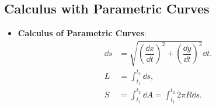 \subsection{Calculus with Parametric Curves} 
\begin{center}
\begin{tcolorbox}
    \begin{itemize}
        \item \textbf{Calculus of Parametric Curves}:
        \begin{align*}
        \dd s &=  \sqrt{\left(\dfrac{\dd x}{\dd t}\right)^2 + \left(\dfrac{\dd y}{\dd t}\right)^2} \dd t. \\
        L &= \int_{t_1}^{t_2}  \dd s,\\
        S &= \int_{t_1}^{t_2} \dd A = \int_{t_1}^{t_2} 2\pi R \dd s.
    \end{align*}
    \end{itemize}
\end{tcolorbox}
\end{center}

